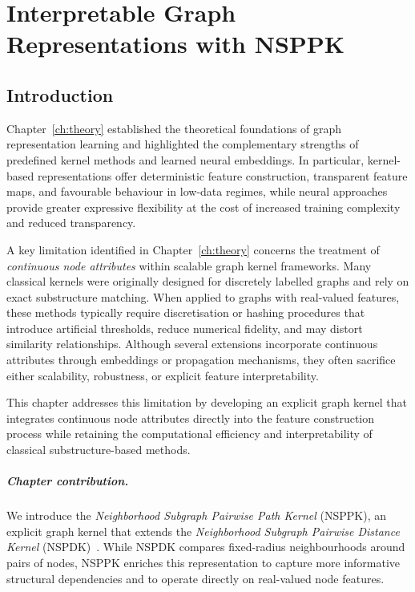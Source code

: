 \chapter{Interpretable Graph Representations with NSPPK}
\label{ch:nsppk}


\section{Introduction}

Chapter~\ref{ch:theory} established the theoretical foundations of graph
representation learning and highlighted the complementary strengths of
predefined kernel methods and learned neural embeddings.
In particular, kernel-based representations offer deterministic feature
construction, transparent feature maps, and favourable behaviour in low-data
regimes, while neural approaches provide greater expressive flexibility at the
cost of increased training complexity and reduced transparency.

A key limitation identified in Chapter~\ref{ch:theory} concerns the treatment of
\emph{continuous node attributes} within scalable graph kernel frameworks.
Many classical kernels were originally designed for discretely labelled graphs
and rely on exact substructure matching. When applied to graphs with
real-valued features, these methods typically require discretisation or
hashing procedures that introduce artificial thresholds, reduce numerical
fidelity, and may distort similarity relationships. Although several extensions
incorporate continuous attributes through embeddings or propagation
mechanisms, they often sacrifice either scalability, robustness, or explicit
feature interpretability.

This chapter addresses this limitation by developing an explicit graph kernel
that integrates continuous node attributes directly into the feature
construction process while retaining the computational efficiency and
interpretability of classical substructure-based methods.

\paragraph{Chapter contribution.}
We introduce the \emph{Neighborhood Subgraph Pairwise Path Kernel} (NSPPK),
an explicit graph kernel that extends the
\emph{Neighborhood Subgraph Pairwise Distance Kernel}
(NSPDK)~\citep{costa2010fast}. While NSPDK compares fixed-radius neighbourhoods
around pairs of nodes, NSPPK enriches this representation to capture more
informative structural dependencies and to operate directly on real-valued node
features.

